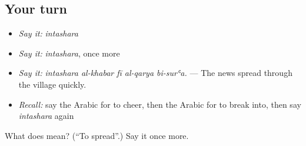 \subsection*{Your turn}
\begin{itemize}
\raggedright
  \item \emph{Say it:} \emph{intashara}
  \item \emph{Say it:} \emph{intashara}, once more
  \item \emph{Say it:} \emph{intashara al-khabar fī al-qarya bi-surʿa.} — The news spread through the village quickly.
  \item \emph{Recall:} say the Arabic for to cheer, then the Arabic for to break into, then say \emph{intashara} again
\end{itemize}

\begin{tcolorbox}[breakable,colback=teal!4,colframe=teal!35!black,title={Before you move on}]
What does  mean? (\textquotedblleft{}To spread\textquotedblright{}.) Say it once more.
\end{tcolorbox}
